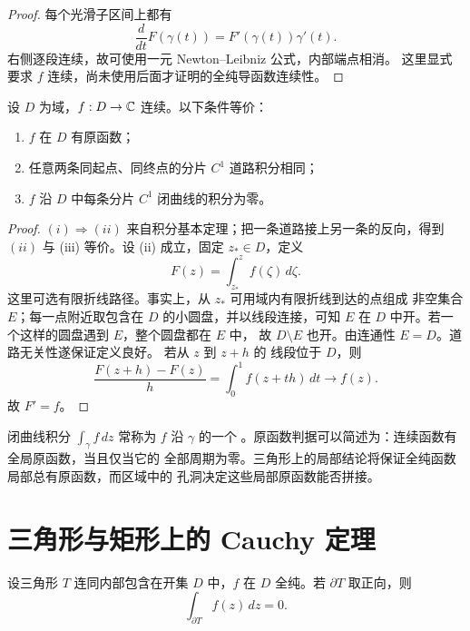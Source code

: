 \begin{proof}
每个光滑子区间上都有
\[
 \frac d{dt}F(\gamma(t))=F'(\gamma(t))\gamma'(t).
\]
右侧逐段连续，故可使用一元 Newton--Leibniz 公式，内部端点相消。
这里显式要求 \(f\) 连续，尚未使用后面才证明的全纯导函数连续性。
\end{proof}

\begin{theorem}[原函数判据]
\label{thm:primitive-path-independence}
设 \(D\) 为域，\(f:D\to\mathbb{C}\) 连续。以下条件等价：
\begin{enumerate}[label=(\roman*)]
 \item \(f\) 在 \(D\) 有原函数；
 \item 任意两条同起点、同终点的分片 \(C^1\) 道路积分相同；
 \item \(f\) 沿 \(D\) 中每条分片 \(C^1\) 闭曲线的积分为零。
\end{enumerate}
\end{theorem}

\begin{proof}
\((i)\Rightarrow(ii)\) 来自积分基本定理；把一条道路接上另一条的反向，得到
\((ii)\) 与 (iii) 等价。设 (ii) 成立，固定 \(z_*\in D\)，定义
\[
 F(z)=\int_{z_*}^{z}f(\zeta)\,d\zeta.
\]
这里可选有限折线路径。事实上，从 \(z_*\) 可用域内有限折线到达的点组成
非空集合 \(E\)；每一点附近取包含在 \(D\) 的小圆盘，并以线段连接，可知
\(E\) 在 \(D\) 中开。若一个这样的圆盘遇到 \(E\)，整个圆盘都在 \(E\) 中，
故 \(D\setminus E\) 也开。由连通性 \(E=D\)。道路无关性遂保证定义良好。
若从 \(z\) 到 \(z+h\) 的
线段位于 \(D\)，则
\[
 \frac{F(z+h)-F(z)}h=\int_0^1f(z+th)\,dt\longrightarrow f(z).
\]
故 \(F'=f\)。
\end{proof}

闭曲线积分 \(\int_\gamma f\,dz\) 常称为 \(f\) 沿 \(\gamma\) 的一个
。原函数判据可以简述为：连续函数有全局原函数，当且仅当它的
全部周期为零。三角形上的局部结论将保证全纯函数局部总有原函数，而区域中的
孔洞决定这些局部原函数能否拼接。

\section{三角形与矩形上的 Cauchy 定理}

\begin{theorem}
\label{thm:goursat-triangle}
设三角形 \(T\) 连同内部包含在开集 \(D\) 中，\(f\) 在 \(D\) 全纯。若
\(\partial T\) 取正向，则
\[
 \int_{\partial T}f(z)\,dz=0.
\]
\end{theorem}

